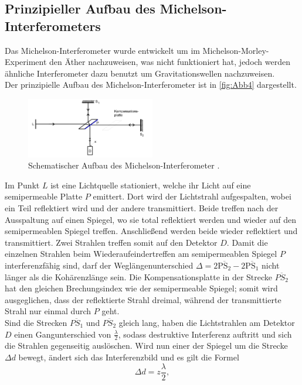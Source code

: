 \subsection{Prinzipieller Aufbau des Michelson-Interferometers}
\label{Aufbau_theo}
Das Michelson-Interferometer wurde entwickelt um im Michelson-Morley-Experiment den Äther nachzuweisen, was nicht funktioniert hat, jedoch werden 
ähnliche Interferometer dazu benutzt um Gravitationswellen nachzuweisen.\\
Der prinzipielle Aufbau des Michelson-Interferometer ist in \autoref{fig:Abb4} dargestellt.
\begin{figure}[H]
    \centering
    \includegraphics[width=0.5\textwidth]{build/Abb4.PNG}
    \caption {Schematischer Aufbau des Michelson-Interferometer \cite[3]{V401}.}
    \label{fig:Abb4}
\end{figure}
Im Punkt $L$ ist eine Lichtquelle stationiert, welche ihr Licht auf eine semipermeable Platte $P$ emittert.
Dort wird der Lichtstrahl aufgespalten, wobei ein Teil reflektiert wird und der andere transmittiert.
Beide treffen nach der Ausspaltung auf einen Spiegel, wo sie total reflektiert werden und wieder auf den semipermeablen Spiegel treffen.
Anschließend werden beide wieder reflektiert und transmittiert. 
Zwei Strahlen treffen somit auf den Detektor $D$. 
Damit die einzelnen Strahlen beim Wiederaufeindertreffen am semipermeablen Spiegel $P$ interferenzfähig sind, darf der Weglängenunterschied 
$ \Delta = 2\overline{\text{PS}_2} - 2\overline{\text{PS}_1} $ nicht länger als die Kohärenzlänge sein. 
Die Kompensationsplatte in der Strecke $\overline{PS_2}$ hat den gleichen Brechungsindex wie der semipermeable Spiegel; somit wird ausgeglichen,
dass der reflektierte Strahl dreimal, während der transmittierte Strahl nur einmal durch $P$ geht.\\
Sind die Strecken $\overline{PS_1}$ und $\overline{PS_2}$ gleich lang, haben die Lichtstrahlen am Detektor $D$ einen Gangunterschied von $\frac{\lambda}{2}$,
sodass destruktive Interferenz auftritt und sich die Strahlen gegenseitig auslöschen.
Wird nun einer der Spiegel um die Strecke $\Delta d$ bewegt, ändert sich das Interferenzbild und es gilt die Formel
\begin{equation}
    \Delta d = z \frac{\lambda}{2},
    \label{eqn:d}
\end{equation}
